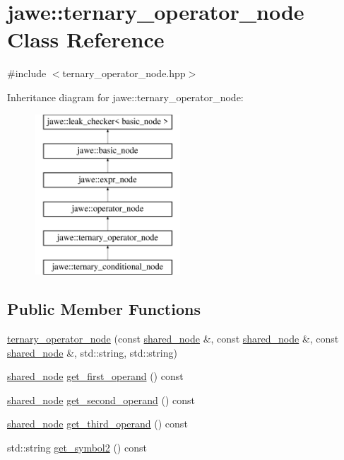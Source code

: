 \hypertarget{classjawe_1_1ternary__operator__node}{}\section{jawe\+:\+:ternary\+\_\+operator\+\_\+node Class Reference}
\label{classjawe_1_1ternary__operator__node}


{\ttfamily \#include $<$ternary\+\_\+operator\+\_\+node.\+hpp$>$}

Inheritance diagram for jawe\+:\+:ternary\+\_\+operator\+\_\+node\+:\begin{figure}[H]
\begin{center}
\leavevmode
\includegraphics[height=6.000000cm]{classjawe_1_1ternary__operator__node}
\end{center}
\end{figure}
\subsection*{Public Member Functions}
\begin{DoxyCompactItemize}
\item 
\hyperlink{classjawe_1_1ternary__operator__node_a17d9ed1359988f480eb0c29b4f9d40d3}{ternary\+\_\+operator\+\_\+node} (const \hyperlink{namespacejawe_a3f307481d921b6cbb50cc8511fc2b544}{shared\+\_\+node} \&, const \hyperlink{namespacejawe_a3f307481d921b6cbb50cc8511fc2b544}{shared\+\_\+node} \&, const \hyperlink{namespacejawe_a3f307481d921b6cbb50cc8511fc2b544}{shared\+\_\+node} \&, std\+::string, std\+::string)
\item 
\hyperlink{namespacejawe_a3f307481d921b6cbb50cc8511fc2b544}{shared\+\_\+node} \hyperlink{classjawe_1_1ternary__operator__node_a2eaef6052f26db59d00de7ba98fc0873}{get\+\_\+first\+\_\+operand} () const
\item 
\hyperlink{namespacejawe_a3f307481d921b6cbb50cc8511fc2b544}{shared\+\_\+node} \hyperlink{classjawe_1_1ternary__operator__node_aab2e0d4afb994ac940ad2221d13ad0ae}{get\+\_\+second\+\_\+operand} () const
\item 
\hyperlink{namespacejawe_a3f307481d921b6cbb50cc8511fc2b544}{shared\+\_\+node} \hyperlink{classjawe_1_1ternary__operator__node_a11d4425ca8009b87e05cb2da8785eb43}{get\+\_\+third\+\_\+operand} () const
\item 
std\+::string \hyperlink{classjawe_1_1ternary__operator__node_a4cf40ba3bef02f705a97d118cedc06d5}{get\+\_\+symbol2} () const
\end{DoxyCompactItemize}
